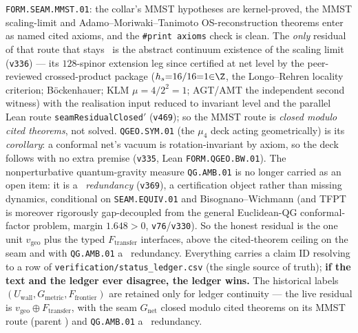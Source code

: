 \begin{keybox}
\texttt{FORM.SEAM.MMST.01}: the collar's MMST hypotheses are kernel-proved, the MMST scaling-limit and
Adamo--Moriwaki--Tanimoto OS-reconstruction theorems enter as named cited axioms, and the \texttt{\#print axioms}
check is clean. The \emph{only} residual of that route that stays \mO\ is the abstract continuum existence of the
scaling limit
(\texttt{v336}) --- its $128$-spinor extension leg since certified at net level by the peer-reviewed
crossed-product package ($h_s{=}16/16{=}1{\in}\Z$, the Longo--Rehren locality criterion; B\"ockenhauer; KLM
$\mu{=}4/2^2{=}1$; AGT/AMT the independent second witness) with the realisation input reduced to invariant level
and the parallel Lean route \texttt{seamResidualClosed$'$} (\texttt{v469}); so the MMST route is \emph{closed
modulo cited theorems}, not solved. \texttt{QGEO.SYM.01} (the $\mu_4$ deck acting geometrically) is its \emph{corollary}: a conformal net's vacuum
is rotation-invariant by axiom, so the deck follows with no extra premise (\texttt{v335}, Lean
\texttt{FORM.QGEO.BW.01}). The nonperturbative quantum-gravity measure \texttt{QG.AMB.01} is no longer carried as an
open item: it is a \mC\ \emph{redundancy} (\texttt{v369}), a certification object rather than missing dynamics,
conditional on \texttt{SEAM.EQUIV.01} and Bisognano--Wichmann (and TFPT is moreover rigorously gap-decoupled from the
general Euclidean-QG conformal-factor problem, margin $1.648>0$, \texttt{v76}/\texttt{v330}). So the honest residual is
the one unit $v_{\mathrm{geo}}$ plus the typed $F_{\mathrm{transfer}}$ interfaces, above the cited-theorem ceiling on
the seam and with \texttt{QG.AMB.01} a \mC\ redundancy.
\noindent Everything carries a claim ID resolving to a row of \texttt{verification/status\_ledger.csv}
(the single source of truth); \textbf{if the text and the ledger ever disagree, the ledger wins.} The
historical labels $(U_{\mathrm{wall}},G_{\mathrm{metric}},F_{\mathrm{frontier}})$ are retained only for
ledger continuity --- the live residual is $v_{\mathrm{geo}}\oplus F_{\mathrm{transfer}}$, with the seam
$G_{\mathrm{net}}$ closed modulo cited theorems on its MMST route (parent \mO) and \texttt{QG.AMB.01} a \mC\
redundancy.
\markerkey
\end{keybox}
